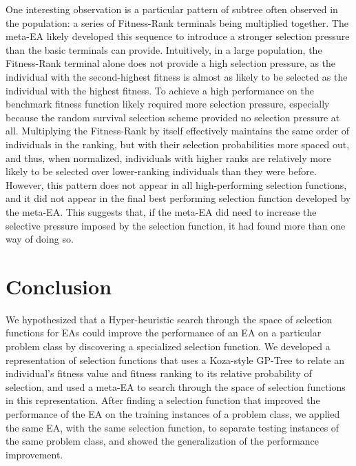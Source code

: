 \documentclass[sigconf]{acmart}
\begin{document}
One interesting observation is a particular pattern of subtree often observed in the population: a series of Fitness-Rank terminals being multiplied together. The meta-EA likely developed this sequence to introduce a stronger selection pressure than the basic terminals can provide. Intuitively, in a large population, the Fitness-Rank terminal alone does not provide a high selection pressure, as the individual with the second-highest fitness is almost as likely to be selected as the individual with the highest fitness. To achieve a high performance on the benchmark fitness function likely required more selection pressure, especially because the random survival selection scheme provided no selection pressure at all. Multiplying the Fitness-Rank by itself effectively maintains the same order of individuals in the ranking, but with their selection probabilities more spaced out, and thus, when normalized, individuals with higher ranks are relatively more likely to be selected over lower-ranking individuals than they were before. However, this pattern does not appear in all high-performing selection functions, and it did not appear in the final best performing selection function developed by the meta-EA. This suggests that, if the meta-EA did need to increase the selective pressure imposed by the selection function, it had found more than one way of doing so.

\section{Conclusion}
\label{Conclusion}
We hypothesized that a Hyper-heuristic search through the space of selection functions for EAs could improve the performance of an EA on a particular problem class by discovering a specialized selection function. We developed a representation of selection functions that uses a Koza-style GP-Tree to relate an individual's fitness value and fitness ranking to its relative probability of selection, and used a meta-EA to search through the space of selection functions in this representation. After finding a selection function that improved the performance of the EA on the training instances of a problem class, we applied the same EA, with the same selection function, to separate testing instances of the same problem class, and showed the generalization of the performance improvement.
\end{document}
